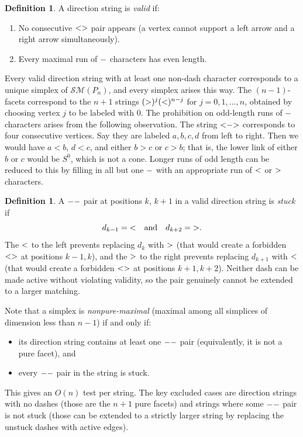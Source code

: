 \documentclass{amsart}
\theoremstyle{definition}
\newtheorem{definition}[theorem]{Definition}
\newcommand{\sm}{{\mathcal{SM}}}
\begin{document}
\begin{definition}\label{def:valid}
A direction string is \emph{valid} if:
\begin{enumerate}
\item No consecutive ${\tt <>}$ pair appears (a vertex cannot
      support a left arrow and a right arrow simultaneously).
\item Every maximal run of ${\tt -}$ characters has even length.
\end{enumerate}
\end{definition}

Every valid direction string with at least one non-dash character corresponds to a unique simplex of $\sm(P_n)$, and every simplex arises this way. The $(n-1)$-facets correspond to the $n+1$ strings $({\tt >})^j({\tt <})^{n-j}$ for $j=0,1,\dots,n$, obtained by choosing vertex $j$ to be labeled with $0$. The prohibition on odd-length runs of ${\tt -}$ characters arises from the following observation. The string ${\tt <}{-}{\tt >}$ corresponds to four consecutive vertices. Say they are labeled $a,b,c,d$ from left to right. Then we would have $a<b$, $d<c$, and either $b>c$ or $c>b$; that is, the lower link of either $b$ or $c$ would be $S^0$, which is not a cone. Longer runs of odd length can be reduced to this by filling in all but one ${\tt -}$ with an appropriate run of ${\tt <}$ or ${\tt >}$ characters.

\begin{definition}\label{stuck}
A ${\tt --}$ pair at positions $k$, $k+1$ in a valid direction string is \emph{stuck} if
\[
d_{k-1} = {\tt <} \quad \text{and} \quad d_{k+2} = {\tt >}.
\]
The ${\tt <}$ to the left prevents replacing $d_k$ with ${\tt >}$ (that would create a forbidden ${\tt <>}$ at positions $k-1, k$), and the ${\tt >}$ to the right prevents replacing $d_{k+1}$ with ${\tt <}$ (that would create a forbidden ${\tt <>}$ at positions $k+1, k+2$). Neither dash can be made active without violating validity, so the pair genuinely cannot be extended to a larger
matching.
\end{definition}

Note that a simplex is \emph{nonpure-maximal} (maximal among all simplices of dimension less than $n-1$) if and only if:
\begin{itemize}
\item its direction string contains at least one ${\tt --}$ pair (equivalently, it is not a pure facet), and
\item every ${\tt --}$ pair in the string is stuck.
\end{itemize}
This gives an $O(n)$ test per string. The key excluded cases are direction strings with no dashes (those are the $n+1$ pure facets) and strings where some ${\tt --}$ pair is not stuck (those can be extended to a strictly larger string by replacing the unstuck dashes with active edges).
\end{document}
